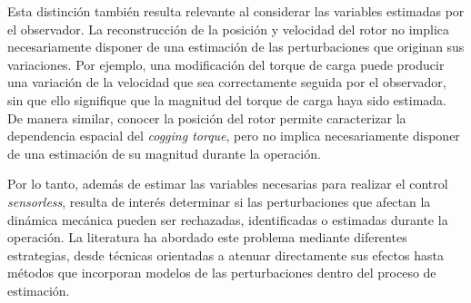 Esta distinción también resulta relevante al considerar las variables
estimadas por el observador. La reconstrucción de la posición y velocidad del
rotor no implica necesariamente disponer de una estimación de las
perturbaciones que originan sus variaciones. Por ejemplo, una modificación del
torque de carga puede producir una variación de la velocidad que sea
correctamente seguida por el observador, sin que ello signifique que la
magnitud del torque de carga haya sido estimada. De manera similar, conocer la
posición del rotor permite caracterizar la dependencia espacial del
\textit{cogging torque}, pero no implica necesariamente disponer de una
estimación de su magnitud durante la operación.

%
%
%
%
%
%
%
%
%
%
%
%
%
%

Por lo tanto, además de estimar las variables necesarias para realizar el
control \textit{sensorless}, resulta de interés determinar si las
perturbaciones que afectan la dinámica mecánica pueden ser rechazadas,
identificadas o estimadas durante la operación. La literatura ha abordado
este problema mediante diferentes estrategias, desde técnicas orientadas a
atenuar directamente sus efectos hasta métodos que incorporan modelos de las
perturbaciones dentro del proceso de estimación.

